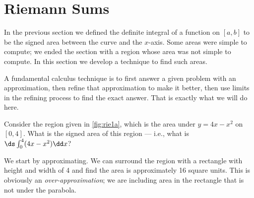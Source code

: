 \section{Riemann Sums}\label{sec:riemann}

In the previous section we defined the definite integral of a function on $[a,b]$ to be the signed area between the curve and the $x$-axis. Some areas were simple to compute; we ended the section with a region whose area was not simple to compute. In this section we develop a technique to find such areas.

A fundamental calculus technique is to first answer a given problem with an approximation, then refine that approximation to make it better, then use limits in the refining process to find the exact answer. That is exactly what we will do here.

Consider the region given in \autoref{fig:rie1a}, which is the area under $y=4x-x^2$ on $[0,4]$. What is the signed area of this region --- i.e., what is $\ds\int_0^4(4x-x^2)\dd x$?


We start by approximating. We can surround the region with a rectangle with height and width of 4 and find the area is approximately 16 square units. This is obviously an \emph{over-approximation}; we are including area in the rectangle that is not under the parabola. 


